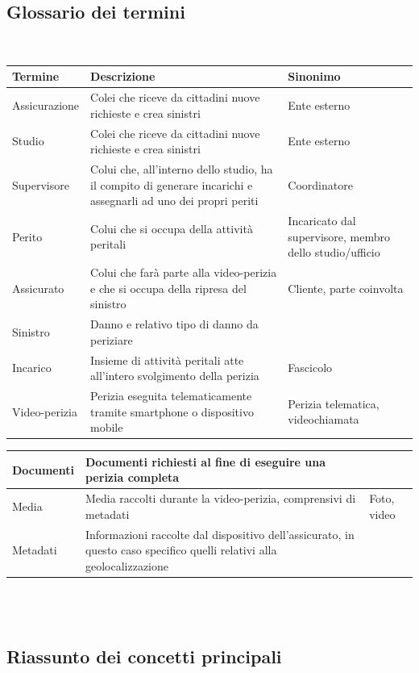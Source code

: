 \documentclass[a4paper,12pt]{report}
\begin{document}
\subsection{Glossario dei termini}
\mbox{}\\
\def\arraystretch{2}%
\begin{tabularx}{\textwidth}{ m{3cm} | m{6cm} | m{3cm}}
    \textbf{Termine} & \textbf{Descrizione} & \textbf{Sinonimo} \\
\hline
Assicurazione & Colei che riceve da cittadini nuove richieste e crea sinistri & Ente esterno\\ \hline
Studio & Colei che riceve da cittadini nuove richieste e crea sinistri & Ente esterno\\ \hline
Supervisore & Colui che, all’interno dello studio, ha il compito di generare incarichi e assegnarli ad uno dei propri periti & Coordinatore\\ \hline
Perito & Colui che si occupa della attività peritali & Incaricato dal supervisore, membro dello studio/ufficio\\ \hline
Assicurato & Colui che farà parte alla video-perizia e che si occupa della ripresa del sinistro & Cliente, parte coinvolta\\ \hline
Sinistro & Danno e relativo tipo di danno da periziare & \\ \hline
Incarico & Insieme di attività peritali atte all’intero svolgimento della perizia & Fascicolo\\ \hline
Video-perizia & Perizia eseguita telematicamente tramite smartphone o dispositivo mobile & Perizia telematica, videochiamata
\\ 

\end{tabularx}

\def\arraystretch{2}%
\begin{tabularx}{\textwidth}{ m{3cm} | m{6cm} | m{3cm}}
Documenti & Documenti richiesti al fine di eseguire una perizia completa & \\ \hline
Media & Media raccolti durante la video-perizia, comprensivi di metadati & Foto, video\\ \hline
Metadati & Informazioni raccolte dal dispositivo dell’assicurato, in questo caso specifico quelli relativi alla geolocalizzazione & \\
\end{tabularx}
\\
\\

\subsection{Riassunto dei concetti principali}
\end{document}

